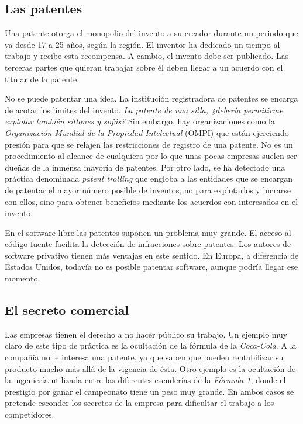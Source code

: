 \subsection{Las patentes}
Una patente otorga el monopolio del invento a su creador durante un
periodo que va desde 17 a 25 años, según la región. El inventor ha
dedicado un tiempo al trabajo y recibe esta recompensa. A cambio, el
invento debe ser publicado. Las terceras partes que quieran trabajar
sobre él deben llegar a un acuerdo con el titular de la patente.

No se puede patentar una idea. La institución registradora de patentes
se encarga de acotar los límites del invento. \emph{La patente de una
  silla, ¿debería permitirme explotar también sillones y sofás?} Sin
embargo, hay organizaciones como la \emph{Organización Mundial de la
  Propiedad Intelectual} (OMPI) que están ejerciendo presión para que
se relajen las restricciones de registro de una patente. No es un
procedimiento al alcance de cualquiera por lo que unas pocas empresas
suelen ser dueñas de la inmensa mayoría de patentes. Por otro lado, se
ha detectado una práctica denominada \emph{patent trolling} que
engloba a las entidades que se encargan de patentar el mayor número
posible de inventos, no para explotarlos y lucrarse con ellos, sino
para obtener beneficios mediante los acuerdos con interesados en el
invento.

En el software libre las patentes suponen un problema muy grande. El
acceso al código fuente facilita la detección de infracciones sobre
patentes. Los autores de software privativo tienen más ventajas en
este sentido. En Europa, a diferencia de Estados Unidos, todavía no es
posible patentar software, aunque podría llegar ese momento.

\subsection{El secreto comercial}
Las empresas tienen el derecho a no hacer público su trabajo. Un
ejemplo muy claro de este tipo de práctica es la ocultación de la
fórmula de la \emph{Coca-Cola}. A la compañía no le interesa una
patente, ya que saben que pueden rentabilizar su producto mucho más
allá de la vigencia de ésta. Otro ejemplo es la ocultación de la
ingeniería utilizada entre las diferentes escuderías de la
\emph{Fórmula 1}, donde el prestigio por ganar el campeonato tiene un
peso muy grande. En ambos casos se pretende esconder los secretos de
la empresa para dificultar el trabajo a los competidores.

